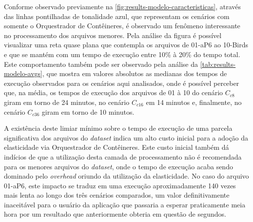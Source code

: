 \documentclass[english,brazilian]{UNISINOSmonografia} %
\begin{document}
Conforme observado previamente na \autoref{fig:results-modelo-caracteristicas}, através das linhas pontilhadas de tonalidade azul, que representam os cenários com somente o Orquestrador de Contêineres, é observado um fenômeno interessante no processamento dos arquivos menores.
%
Pela análise da figura é possível visualizar uma reta quase plana que contempla os arquivos de 01-aP6 ao 10-Birds e que se mantém com um tempo de execução entre 10\% à 20\% do tempo total.
%
Este comportamento também pode ser observado pela análise da \autoref{tab:results-modelo-avgs}, que mostra em valores absolutos as medianas dos tempos de execução observados para os cenários aqui analisados, onde é possível perceber que, na média, os tempos de execução dos arquivos de 01 à 10 do cenário $C_{c8}$ giram em torno de 24 minutos, no cenário $C_{c16}$ em 14 minutos e, finalmente, no cenário $C_{c36}$ giram em torno de 10 minutos.


A existência deste limiar mínimo sobre o tempo de execução de uma parcela significativa dos arquivos do \textit{dataset} indica um alto custo inicial para a adoção da elasticidade via Orquestrador de Contêineres.
%
Este custo inicial também dá indícios de que a utilização desta camada de processamento não é recomendada para os menores arquivos do \textit{dataset}, onde o tempo de execução acaba sendo dominado pelo \textit{overhead} oriundo da utilização da elasticidade.
%
No caso do arquivo 01-aP6, este impacto se traduz em uma execução aproximadamente 140 vezes mais lenta ao longo dos três cenários comparados, um valor definitivamente inaceitável para o usuário da aplicação que passaria a esperar praticamente meia hora por um resultado que anteriormente obteria em questão de segundos.
\end{document}

